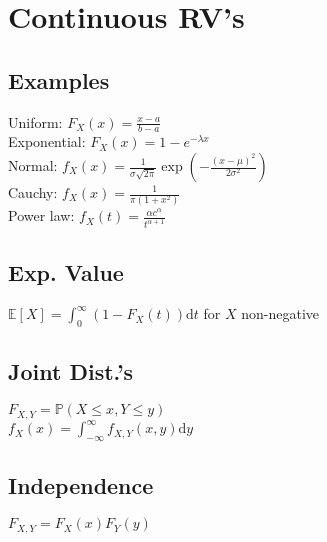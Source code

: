\section{Continuous RV's}

	\subsection*{Examples}
	Uniform: $F_{X}\left(x\right) = \frac{x - a}{b - a}$\\
	Exponential: $F_{X}\left(x\right) = 1 - e^{-\lambda x}$\\
	Normal: $f_{X}\left(x\right) = \frac{1}{\sigma\sqrt{2\pi}}\exp\left(-\frac{\left(x - \mu\right)^{2}}{2\sigma^{2}}\right)$\\
	Cauchy: $f_{X}\left(x\right) = \frac{1}{\pi\left(1 + x^{2}\right)}$\\
	Power law: $f_{X}\left(t\right) = \frac{\alpha c^{\alpha}}{t^{\alpha + 1}}$
	
	\subsection*{Exp. Value}
	$\mathbb{E}\left[X\right] = \int_{0}^{\infty}\left(1 - F_{X}\left(t\right)\right)\mathrm{d}t$ for $X$ non-negative
	
	\subsection*{Joint Dist.'s}
	$F_{X,Y} = \mathbb{P}\left(X\leq x, Y\leq y\right)$\\
	$f_{X}\left(x\right) = \int_{-\infty}^{\infty}\!f_{X,Y}\left(x,y\right)\mathrm{d}y$
	
	\subsection*{Independence}
	$F_{X,Y} = F_{X}(x)F_{Y}(y)$
	